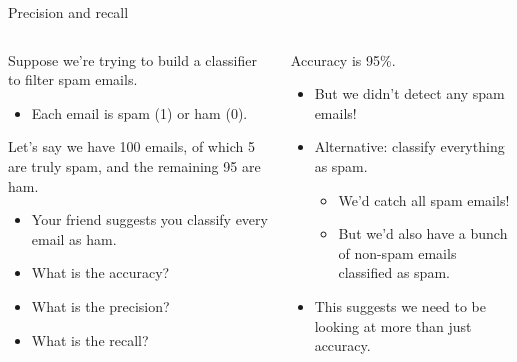 \documentclass[aspectratio=169]{../latex_main/tntbeamer}  %
\begin{document}
	
	
	\begin{frame}{Precision and recall}
	  \begin{columns}
	        \begin{column}{.5\textwidth}
                 Suppose we’re trying to build a classifier to filter spam emails.
        	    \begin{itemize}
        	        \item Each email is spam (1) or ham (0).
        	    \end{itemize}
        	    Let’s say we have 100 emails, of which 5 are truly spam, and the remaining 95 are ham.
        	    \begin{itemize}
        	        \item Your friend suggests you classify every email as ham.
        	        \item What is the accuracy?
        	        \item What is the precision?
        	        \item What is the recall?
        	    \end{itemize}
	        \end{column}
	        
	        
	        \begin{column}{.5\textwidth}
	                Accuracy is 95\%.
                    \begin{itemize}
                        \item But we didn’t detect any spam emails!
                        \item Alternative: classify everything as spam.
                        \begin{itemize}
                            \item We’d catch all spam emails!
                            \item But we’d also have a bunch of non-spam emails classified as spam.
                        \end{itemize}
                        \item This suggests we need to be looking at more than just accuracy.
                    \end{itemize}
	        \end{column}
	    \end{columns}
	\end{frame}
	
	
	
\end{document}
